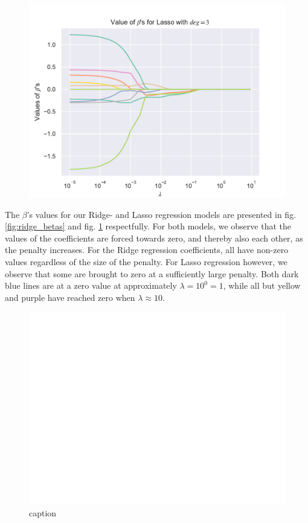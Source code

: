 \begin{figure}
    \centering
    \includegraphics[width=1\linewidth]{project_1_alt/figures/data/Lasso_Betas_lambda_Franke_Noise_const_deg.pdf}
    \caption{}
    \label{fig:lasso_betas}
\end{figure}

The $\beta$'s values for our Ridge- and Lasso regression models are presented in fig. \ref{fig:ridge_betas} and fig. \ref{fig:lasso_betas} respectfully. For both models, we observe that the values of the coefficients are forced towards zero, and thereby also each other, as the penalty increases. For the Ridge regression coefficients, all have non-zero values regardless of the size of the penalty. For Lasso regression however, we observe that some are brought to zero at a sufficiently large penalty. Both dark blue lines are at a zero value at approximately $\lambda = 10^0 = 1$, while all but yellow and purple have reached zero when $\lambda \approx 10$. 

\begin{figure}[h!]
    \centering
    \includegraphics[width=1\linewidth]{project_1_alt/figures/data/bias_var_Franke_Noise_bootstrap.pdf}
    \caption{caption}
    \label{bias_var_trade}
\end{figure}

